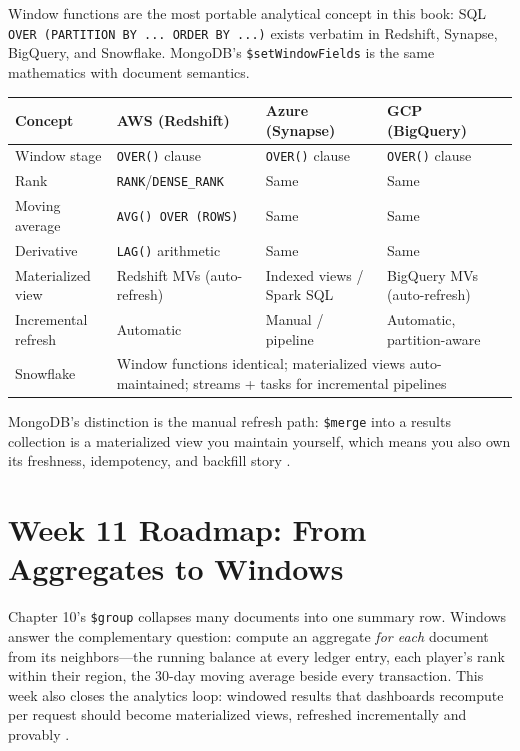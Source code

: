 \begin{crosscloud}
Window functions are the most portable analytical concept in this book: SQL \texttt{OVER (PARTITION BY ... ORDER BY ...)} exists verbatim in Redshift, Synapse, BigQuery, and Snowflake. MongoDB's \texttt{\$setWindowFields} is the same mathematics with document semantics.

\vspace{2mm}
{\footnotesize
\begin{tabular}{@{}p{2.9cm}p{3.0cm}p{3.0cm}p{3.0cm}@{}} 
\toprule
\textbf{Concept} & \textbf{AWS (Redshift)} & \textbf{Azure (Synapse)} & \textbf{GCP (BigQuery)} \\
\midrule
Window stage & \texttt{OVER()} clause & \texttt{OVER()} clause & \texttt{OVER()} clause \\
Rank & \texttt{RANK}/\texttt{DENSE\_RANK} & Same & Same \\
Moving average & \texttt{AVG() OVER (ROWS)} & Same & Same \\
Derivative & \texttt{LAG()} arithmetic & Same & Same \\
Materialized view & Redshift MVs (auto-refresh) & Indexed views / Spark SQL & BigQuery MVs (auto-refresh) \\
Incremental refresh & Automatic & Manual / pipeline & Automatic, partition-aware \\
\addlinespace
Snowflake & \multicolumn{3}{l}{Window functions identical; materialized views auto-maintained; streams + tasks for incremental pipelines} \\
\bottomrule
\end{tabular}}

\vspace{1mm}
MongoDB's distinction is the manual refresh path: \texttt{\$merge} into a results collection is a materialized view you maintain yourself, which means you also own its freshness, idempotency, and backfill story \cite{mongodbSetWindowFieldsDocs,kleppmann2017ddia}.
\end{crosscloud}

\section{Week 11 Roadmap: From Aggregates to Windows}
Chapter 10's \texttt{\$group} collapses many documents into one summary row. Windows answer the complementary question: compute an aggregate \emph{for each} document from its neighbors---the running balance at every ledger entry, each player's rank within their region, the 30-day moving average beside every transaction. This week also closes the analytics loop: windowed results that dashboards recompute per request should become materialized views, refreshed incrementally and provably \cite{mongodbSetWindowFieldsDocs}.

